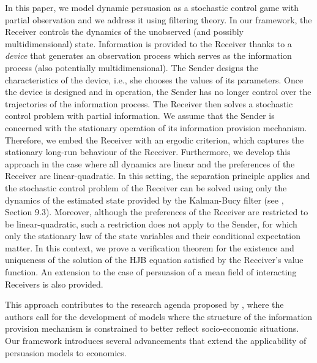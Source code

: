 \documentclass[a4paper,10pt]{article}
\theoremstyle{definition}
\theoremstyle{plain}
\numberwithin{equation}{section}
\begin{document}
\medskip

In this paper, we model dynamic persuasion as a stochastic control game with partial observation and we address it using filtering theory. In our framework, the Receiver controls the dynamics of the unobserved (and possibly multidimensional) state. Information is provided to the Receiver thanks to a {\em device} that generates an observation process  which serves as the information process (also potentially multidimensional). The Sender designs the characteristics of the device, i.e., she chooses the values of its parameters. Once the device is designed and in operation, the Sender has no longer control over the trajectories of the information process. The Receiver then solves a stochastic control problem with partial information. We assume that the Sender is concerned with the stationary operation of its information provision mechanism. Therefore, we embed the Receiver with an ergodic criterion, which captures the stationary long-run behaviour of the Receiver. Furthermore, we develop this approach in the case where all dynamics are linear and the preferences of the Receiver are linear-quadratic. In this setting, the separation principle applies and the stochastic control problem of the Receiver can be solved using only the dynamics of the estimated state provided by the Kalman-Bucy filter (see \cite{Bensoussan18}, Section 9.3). Moreover, although the preferences of the Receiver are restricted to be linear-quadratic, such a restriction does not apply to the Sender, for which only the stationary law of the state variables and their conditional expectation matter. In this context, we prove a verification theorem for the existence and uniqueness of the solution of the HJB equation satisfied by the Receiver's value function. An extension to the case of persuasion of a mean field of interacting Receivers is also provided.
\medskip

This approach contributes to the research agenda proposed by \cite{Kamenica21}, where the authors call for the development of models where the structure of the information provision mechanism is constrained to better reflect socio-economic situations. Our framework introduces several advancements that extend the applicability of persuasion models to economics.
\end{document}
